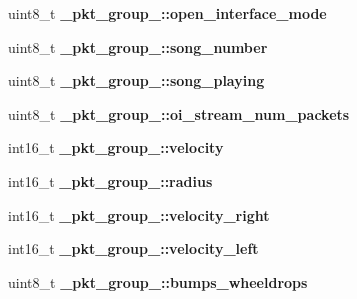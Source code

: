 \begin{DoxyCompactItemize}
\item 
\hypertarget{group__roomba-lib_gac2f02a70107dd608fd52ce6fd7e0e6e8}{}uint8\+\_\+t {\bfseries \+\_\+pkt\+\_\+group\+\_\+::open\+\_\+interface\+\_\+mode}\label{group__roomba-lib_gac2f02a70107dd608fd52ce6fd7e0e6e8}

\item 
\hypertarget{group__roomba-lib_ga4555c6fbef8603704920f166b769c336}{}uint8\+\_\+t {\bfseries \+\_\+pkt\+\_\+group\+\_\+::song\+\_\+number}\label{group__roomba-lib_ga4555c6fbef8603704920f166b769c336}

\item 
\hypertarget{group__roomba-lib_gad0ca49b2f11f06d401f9487315d87f3c}{}uint8\+\_\+t {\bfseries \+\_\+pkt\+\_\+group\+\_\+::song\+\_\+playing}\label{group__roomba-lib_gad0ca49b2f11f06d401f9487315d87f3c}

\item 
\hypertarget{group__roomba-lib_gac5aa7f5bbd15fc5d47626edba0c28663}{}uint8\+\_\+t {\bfseries \+\_\+pkt\+\_\+group\+\_\+::oi\+\_\+stream\+\_\+num\+\_\+packets}\label{group__roomba-lib_gac5aa7f5bbd15fc5d47626edba0c28663}

\item 
\hypertarget{group__roomba-lib_ga5a709be41fa0b2c21b9e680ac3576210}{}int16\+\_\+t {\bfseries \+\_\+pkt\+\_\+group\+\_\+::velocity}\label{group__roomba-lib_ga5a709be41fa0b2c21b9e680ac3576210}

\item 
\hypertarget{group__roomba-lib_gaa74b14e5372c0a8c7bd5e4b1cf93ae77}{}int16\+\_\+t {\bfseries \+\_\+pkt\+\_\+group\+\_\+::radius}\label{group__roomba-lib_gaa74b14e5372c0a8c7bd5e4b1cf93ae77}

\item 
\hypertarget{group__roomba-lib_ga10b7bddf0983644e3a9321a57a6284d9}{}int16\+\_\+t {\bfseries \+\_\+pkt\+\_\+group\+\_\+::velocity\+\_\+right}\label{group__roomba-lib_ga10b7bddf0983644e3a9321a57a6284d9}

\item 
\hypertarget{group__roomba-lib_gae8cc0bf870e2a6dbfadb014db81cfbfe}{}int16\+\_\+t {\bfseries \+\_\+pkt\+\_\+group\+\_\+::velocity\+\_\+left}\label{group__roomba-lib_gae8cc0bf870e2a6dbfadb014db81cfbfe}

\item 
\hypertarget{group__roomba-lib_ga3004971973262fcf3431e8d44e2e95bd}{}uint8\+\_\+t {\bfseries \+\_\+pkt\+\_\+group\+\_\+::bumps\+\_\+wheeldrops}\label{group__roomba-lib_ga3004971973262fcf3431e8d44e2e95bd}


\end{DoxyCompactItemize}
